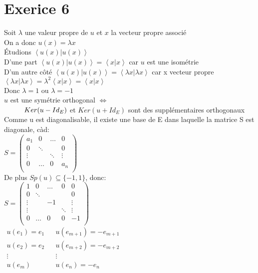 \documentclass{article}
\author{Frederic Becerril}
\newcommand\tab[1][1cm]{\hspace*{#1}}
\newcommand{\scalaire}[2]{\left< #1 | #2\right>}
\begin{document}
\part*{Exerice 6}

Soit $\lambda$ une valeur propre de $u$ et $x$ la vecteur propre associé\\
On a donc $u(x) = \lambda x$\\
Étudions $\scalaire{u(x)}{u(x)}$\\
D'une part $\scalaire{u(x)}{u(x)} = \scalaire{x}{x}$ car $u$ est une isométrie\\
D'un autre côté $\scalaire{u(x)}{u(x)} = \scalaire{\lambda x}{\lambda x}$ car x vecteur propre\\
$\scalaire{\lambda x}{\lambda x} = \lambda^2 \scalaire{x}{x} = \scalaire{x}{x}$\\
Donc $\lambda = 1$ ou $\lambda = -1$\\
$u$ est une symétrie orthogonal $\Leftrightarrow$\\
$\tab Ker(u - Id_E)$ et $Ker(u + Id_E)$ sont des supplémentaires orthogonaux\\
Comme u est diagonalisable, il existe une base de E dans laquelle la matrice S est diagonale, càd:\\
$S = \begin{pmatrix}
    a_1 & 0 & \dots & 0\\
    0 & \ddots &  & 0\\
    \vdots &  &  \ddots & \vdots\\
    0 & \dots & 0 & a_n\\
\end{pmatrix}$\\
De plus $Sp(u) \subseteq \{-1, 1\}$, donc:\\
$S = \begin{pmatrix}
    1 & 0 & \dots & 0 & 0\\
    0 & \ddots & & & 0\\
    \vdots & & -1 & & \vdots\\
    \vdots & & & \ddots & \vdots\\
    0 & \dots & 0 & 0 & -1\\
\end{pmatrix}$\\
$\begin{matrix}
    u(e_1) = e_1 & & u(e_{m+1}) = -e_{m + 1}\\
    u(e_2) = e_2 & & u(e_{m+2}) = -e_{m + 2}\\
    \vdots  & & \vdots\\
    u(e_m)  & & u(e_n) = -e_n\\
\end{matrix}$\\
\end{document}
